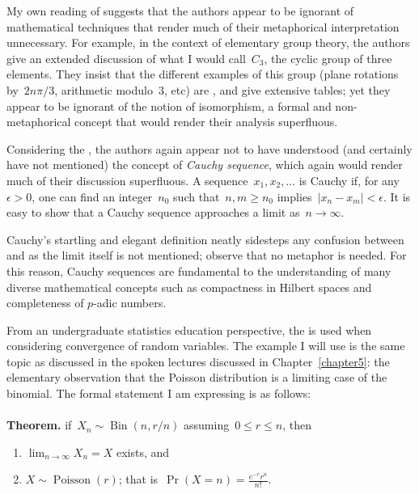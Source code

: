My own reading of \wmcf suggests that the authors appear to be
ignorant of mathematical techniques that render much of their
metaphorical interpretation unnecessary.  For example, in the context
of elementary group theory, the authors give an extended discussion of
what I would call~$C_3$, the cyclic group of three elements.  They
insist that the different examples of this group (plane rotations
by~$2n\pi/3$, arithmetic modulo~$3$, etc) are , and give extensive tables; yet they appear to be ignorant
of the notion of isomorphism, a formal and non-metaphorical concept
that would render their analysis superfluous.

Considering the \bmi, the authors again appear not to have understood
(and certainly have not mentioned) the concept of \emph{Cauchy
  sequence}, which again would render much of their discussion
superfluous.  A sequence~$x_1,x_2,\ldots$ is Cauchy if, for
any~$\epsilon>0$, one can find an integer~$n_0$ such
that~$n,m\geqslant n_0$ implies~$\left|{x_n-x_m}\right|<\epsilon$.  It
is easy to show that a Cauchy sequence approaches a limit
as~$n\longrightarrow\infty$.

Cauchy's startling and elegant definition neatly sidesteps any
confusion between  and  as the limit itself is not mentioned; observe that no
metaphor is needed.  For this reason, Cauchy sequences are fundamental
to the understanding of many diverse mathematical concepts such as
compactness in Hilbert spaces and completeness of $p$-adic numbers.

From an undergraduate statistics education perspective, the \bmi is
used when considering convergence of random variables.  The example I
will use is the same topic as discussed in the spoken lectures
discussed in Chapter~\ref{chapter5}: the elementary observation that
the Poisson distribution is a limiting case of the binomial.  The
formal statement I am expressing is as follows: \\ \\

{\bf Theorem.}  if~$X_n\sim\operatorname{Bin}\left({n,r/n}\right)$
assuming~$0\leqslant r\leqslant n$, then
  \begin{enumerate}
  \item ${\displaystyle
    \lim_{n\longrightarrow\infty}X_n=X}$ exists, and
  \item $X\sim\operatorname{Poisson}\left({r}\right)$; that
    is~$\operatorname{Pr}\left({X=n}\right) = \frac{e^{-r}{r^n}}{n!}$.
  \end{enumerate}

